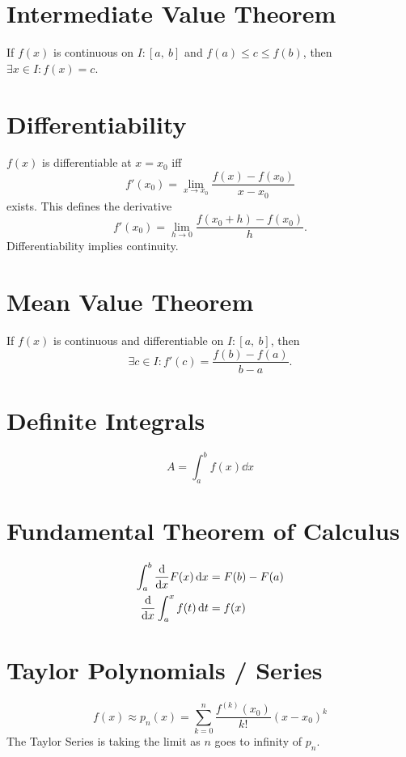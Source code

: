\documentclass{article}
\begin{document}
\begin{multicols}{3}
    \section*{Intermediate Value Theorem}
    If $f(x)$ is continuous on $I:\left[ a, \: b \right]$ and $f(a) \leq c \leq f(b)$, then $\exists x\in I:f(x)=c$.
    \section*{Differentiability}
    $f(x)$ is differentiable at $x=x_0$ iff
    \begin{equation*}
        f'(x_0) = \lim_{x\to x_0} \frac{f(x)-f(x_0)}{x-x_0}
    \end{equation*}
    exists. This defines the derivative
    \begin{equation*}
        f'(x_0) = \lim_{h\to 0} \frac{f(x_0+h)-f(x_0)}{h}.
    \end{equation*}
    Differentiability implies continuity.
    \section*{Mean Value Theorem}
    If $f(x)$ is continuous and differentiable on $I:\left[ a,\:b \right]$, then
    \begin{equation*}
        \exists c\in I:f'(c)=\frac{f(b)-f(a)}{b-a}.
    \end{equation*}
    \section*{Definite Integrals}
    \begin{equation*}
        A = \int_a^b f(x) \dd{x}
    \end{equation*}
    \section*{Fundamental Theorem of Calculus}
    \begin{align*}
        \int_a^b \dv{x}F(x) \dd{x} & = F(b) - F(a) \\
        \dv{x}\int_a^x f(t) \dd{t} & = f(x)
    \end{align*}
    \section*{Taylor Polynomials / Series}
    \begin{equation*}
        f(x) \approx p_n(x) = \sum_{k=0}^n \frac{f^{\left( k \right)}(x_0)}{k!} \left( x-x_0 \right)^k
    \end{equation*}
    The Taylor Series is taking the limit as $n$ goes to infinity of $p_n$.


\end{multicols}
\end{document}

